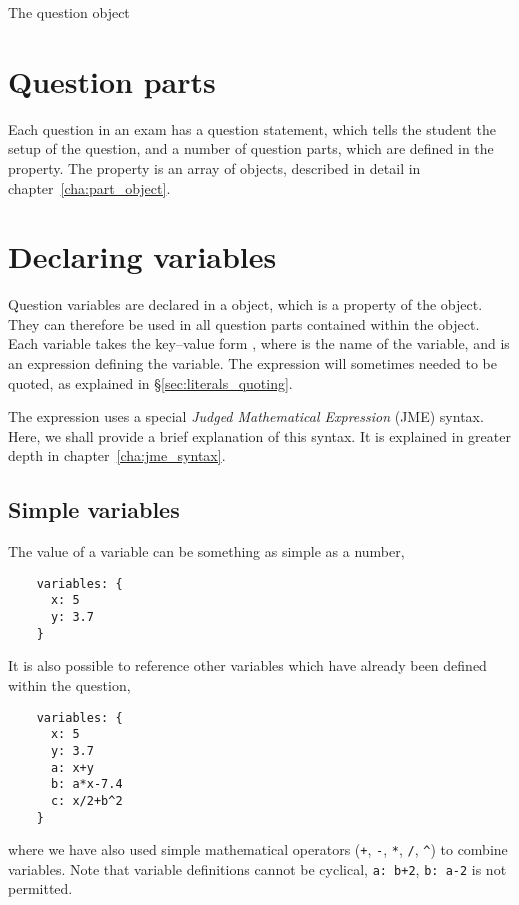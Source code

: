 \begin{chapter}{\label{cha:question_object}The question object}
  \section{Question parts}
  Each question in an exam has a question statement, which tells the student
  the setup of the question, and a number of question parts, which are defined
  in the  property.  The  property is an array
  of  objects, described in detail in
  chapter~\ref{cha:part_object}.

  \section{\label{sec:declaring_variables}Declaring variables}
  Question variables are declared in a  object, which is
  a property of the  object.  They can therefore be used
  in all question parts contained within the  object.
  Each variable takes the key--value form , where
   is the name of the variable, and  is an
  expression defining the variable.  The expression will sometimes needed to be
  quoted, as explained in \S\ref{sec:literals_quoting}.
  
  The expression  uses a special \emph{Judged Mathematical
  Expression} (JME) syntax.  Here, we shall provide a brief explanation of this
  syntax.  It is explained in greater depth in chapter~\ref{cha:jme_syntax}.

  \subsection{Simple variables}
  The value of a variable can be something as simple as a number, \eg
  \begin{Verbatim}
    variables: {
      x: 5
      y: 3.7
    }
  \end{Verbatim}
  It is also possible to reference other variables which have already been
  defined within the question, \eg
  \begin{Verbatim}
    variables: {
      x: 5
      y: 3.7
      a: x+y
      b: a*x-7.4
      c: x/2+b^2
    }
  \end{Verbatim}
  where we have also used simple mathematical operators (\verb"+", \verb"-",
  \verb"*", \verb"/", \verb"^") to combine variables.  Note that variable
  definitions cannot be cyclical, \eg \verb"a: b+2", \verb"b: a-2" is not
  permitted.


\end{chapter}
